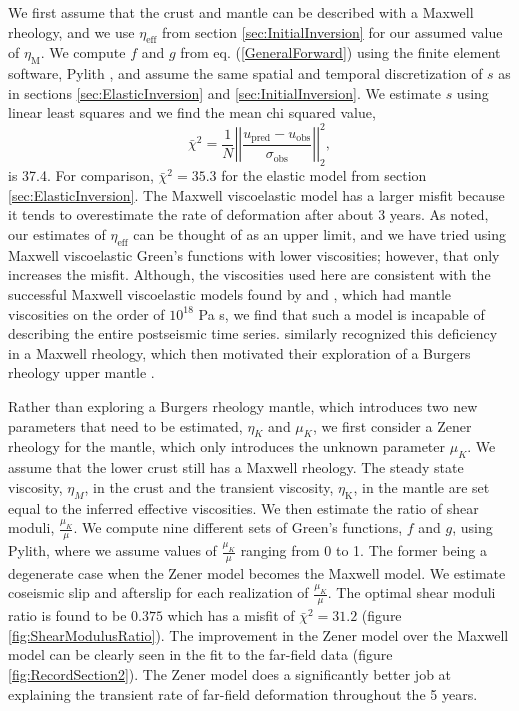 \documentclass[1p]{elsarticle}
\begin{document}
We first assume that the crust and mantle can be described with a Maxwell rheology, and we use $\eta_{\mathrm{eff}}$ from section \ref{sec:InitialInversion} for our assumed value of $\eta_{\mathrm{M}}$.  We compute $f$ and $g$ from eq. (\ref{GeneralForward}) using the finite element software, Pylith \citep{Aagaard2009}, and assume the same spatial and temporal discretization of $s$ as in sections \ref{sec:ElasticInversion} and \ref{sec:InitialInversion}. We estimate $s$ using linear least squares and we find the mean chi squared value,
\begin{equation}\label{eq:Misfit}
  \bar\chi^2 = \frac{1}{N}\left|\left|\frac{u_\mathrm{pred} - u_\mathrm{obs}}{\sigma_\mathrm{obs}}\right|\right|_2^2,
\end{equation}
is 37.4. For comparison, $\bar\chi^2=35.3$ for the elastic model from section \ref{sec:ElasticInversion}. The Maxwell viscoelastic model has a larger misfit because it tends to overestimate the rate of deformation after about 3 years.  As noted, our estimates of $\eta_\mathrm{eff}$ can be thought of as an upper limit, and we have tried using Maxwell viscoelastic Green's functions with lower viscosities; however, that only increases the misfit. Although, the viscosities used here are consistent with the successful Maxwell viscoelastic models found by \citet{Rollins2015} and \citet{Spinler2015}, which had mantle viscosities on the order of $10^{18}$ Pa s, we find that such a model is incapable of describing the entire postseismic time series.  \citet{Pollitz2001} similarly recognized this deficiency in a Maxwell rheology, which then motivated their exploration of a Burgers rheology upper mantle \citep{Pollitz2003}.  

Rather than exploring a Burgers rheology mantle, which introduces two new parameters that need to be estimated, $\eta_{K}$ and $\mu_{K}$, we first consider a Zener rheology for the mantle, which only introduces the unknown parameter $\mu_{K}$.  We assume that the lower crust still has a Maxwell rheology. The steady state viscosity, $\eta_{M}$, in the crust and the transient viscosity, $\eta_\mathrm{K}$, in the mantle are set equal to the inferred effective viscosities.  We then estimate the ratio of shear moduli, $\frac{\mu_K}{\mu}$. We compute nine different sets of Green's functions, $f$ and $g$, using Pylith, where we assume values of $\frac{\mu_K}{\mu}$ ranging from 0 to 1. The former being a degenerate case when the Zener model becomes the Maxwell model.  We estimate coseismic slip and afterslip for each realization of $\frac{\mu_K}{\mu}$.  The optimal shear moduli ratio is found to be $0.375$ which has a misfit of $\bar\chi^2=31.2$ (figure \ref{fig:ShearModulusRatio}).  The improvement in the Zener model over the Maxwell model can be clearly seen in the fit to the far-field data (figure \ref{fig:RecordSection2}). The Zener model does a significantly better job at explaining the transient rate of far-field deformation throughout the 5 years.  
\end{document}
